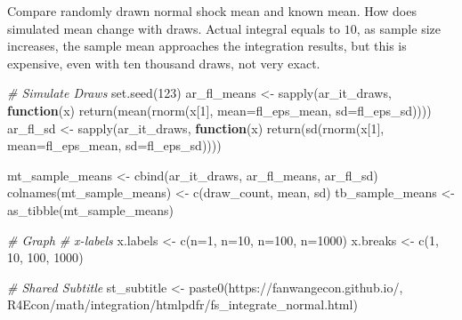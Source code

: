 \documentclass[
]{book}
\newenvironment{Shaded}{\begin{snugshade}}{\end{snugshade}}
\newcommand{\AttributeTok}[1]{\textcolor[rgb]{0.77,0.63,0.00}{#1}}
\newcommand{\CommentTok}[1]{\textcolor[rgb]{0.56,0.35,0.01}{\textit{#1}}}
\newcommand{\ControlFlowTok}[1]{\textcolor[rgb]{0.13,0.29,0.53}{\textbf{#1}}}
\newcommand{\DecValTok}[1]{\textcolor[rgb]{0.00,0.00,0.81}{#1}}
\newcommand{\FunctionTok}[1]{\textcolor[rgb]{0.00,0.00,0.00}{#1}}
\newcommand{\NormalTok}[1]{#1}
\newcommand{\OtherTok}[1]{\textcolor[rgb]{0.56,0.35,0.01}{#1}}
\newcommand{\StringTok}[1]{\textcolor[rgb]{0.31,0.60,0.02}{#1}}
\begin{document}
Compare randomly drawn normal shock mean and known mean. How does simulated mean change with draws. Actual integral equals to \(10\), as sample size increases, the sample mean approaches the integration results, but this is expensive, even with ten thousand draws, not very exact.

\begin{Shaded}
\begin{Highlighting}[]
\CommentTok{\# Simulate Draws}
\FunctionTok{set.seed}\NormalTok{(}\DecValTok{123}\NormalTok{)}
\NormalTok{ar\_fl\_means }\OtherTok{\textless{}{-}}
  \FunctionTok{sapply}\NormalTok{(ar\_it\_draws, }\ControlFlowTok{function}\NormalTok{(x)}
    \FunctionTok{return}\NormalTok{(}\FunctionTok{mean}\NormalTok{(}\FunctionTok{rnorm}\NormalTok{(x[}\DecValTok{1}\NormalTok{], }\AttributeTok{mean=}\NormalTok{fl\_eps\_mean, }\AttributeTok{sd=}\NormalTok{fl\_eps\_sd))))}
\NormalTok{ar\_fl\_sd }\OtherTok{\textless{}{-}}
  \FunctionTok{sapply}\NormalTok{(ar\_it\_draws, }\ControlFlowTok{function}\NormalTok{(x)}
    \FunctionTok{return}\NormalTok{(}\FunctionTok{sd}\NormalTok{(}\FunctionTok{rnorm}\NormalTok{(x[}\DecValTok{1}\NormalTok{], }\AttributeTok{mean=}\NormalTok{fl\_eps\_mean, }\AttributeTok{sd=}\NormalTok{fl\_eps\_sd))))}

\NormalTok{mt\_sample\_means }\OtherTok{\textless{}{-}} \FunctionTok{cbind}\NormalTok{(ar\_it\_draws, ar\_fl\_means, ar\_fl\_sd)}
\FunctionTok{colnames}\NormalTok{(mt\_sample\_means) }\OtherTok{\textless{}{-}} \FunctionTok{c}\NormalTok{(}\StringTok{\textquotesingle{}draw\_count\textquotesingle{}}\NormalTok{, }\StringTok{\textquotesingle{}mean\textquotesingle{}}\NormalTok{, }\StringTok{\textquotesingle{}sd\textquotesingle{}}\NormalTok{)}
\NormalTok{tb\_sample\_means }\OtherTok{\textless{}{-}} \FunctionTok{as\_tibble}\NormalTok{(mt\_sample\_means)}

\CommentTok{\# Graph}
\CommentTok{\# x{-}labels}
\NormalTok{x.labels }\OtherTok{\textless{}{-}} \FunctionTok{c}\NormalTok{(}\StringTok{\textquotesingle{}n=1\textquotesingle{}}\NormalTok{, }\StringTok{\textquotesingle{}n=10\textquotesingle{}}\NormalTok{, }\StringTok{\textquotesingle{}n=100\textquotesingle{}}\NormalTok{, }\StringTok{\textquotesingle{}n=1000\textquotesingle{}}\NormalTok{)}
\NormalTok{x.breaks }\OtherTok{\textless{}{-}} \FunctionTok{c}\NormalTok{(}\DecValTok{1}\NormalTok{, }\DecValTok{10}\NormalTok{, }\DecValTok{100}\NormalTok{, }\DecValTok{1000}\NormalTok{)}

\CommentTok{\# Shared Subtitle}
\NormalTok{st\_subtitle }\OtherTok{\textless{}{-}} \FunctionTok{paste0}\NormalTok{(}\StringTok{\textquotesingle{}https://fanwangecon.github.io/\textquotesingle{}}\NormalTok{,}
                      \StringTok{\textquotesingle{}R4Econ/math/integration/htmlpdfr/fs\_integrate\_normal.html\textquotesingle{}}\NormalTok{)}


\end{Highlighting}
\end{Shaded}
\end{document}
